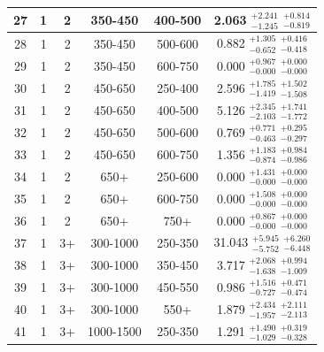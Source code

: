 \begin{table}[htbp]
\begin{centering}
\begin{tabular}{|c|c|c|c|c||c|}
\hline
27 &               1 &               2 &         350-450 &         400-500 & 2.063 $^{+2.241}_{-1.245}$ $^{+0.814}_{-0.819}$ \\ 
\hline
28 &               1 &               2 &         350-450 &         500-600 & 0.882 $^{+1.305}_{-0.652}$ $^{+0.416}_{-0.418}$ \\ 
\hline
29 &               1 &               2 &         350-450 &         600-750 & 0.000 $^{+0.967}_{-0.000}$ $^{+0.000}_{-0.000}$ \\ 
\hline
30 &               1 &               2 &         450-650 &         250-400 & 2.596 $^{+1.785}_{-1.419}$ $^{+1.502}_{-1.508}$ \\ 
\hline
31 &               1 &               2 &         450-650 &         400-500 & 5.126 $^{+2.345}_{-2.103}$ $^{+1.741}_{-1.772}$ \\ 
\hline
32 &               1 &               2 &         450-650 &         500-600 & 0.769 $^{+0.771}_{-0.463}$ $^{+0.295}_{-0.297}$ \\ 
\hline
33 &               1 &               2 &         450-650 &         600-750 & 1.356 $^{+1.183}_{-0.874}$ $^{+0.984}_{-0.986}$ \\ 
\hline
34 &               1 &               2 &            650+ &         250-600 & 0.000 $^{+1.431}_{-0.000}$ $^{+0.000}_{-0.000}$ \\ 
\hline
35 &               1 &               2 &            650+ &         600-750 & 0.000 $^{+1.508}_{-0.000}$ $^{+0.000}_{-0.000}$ \\ 
\hline
36 &               1 &               2 &            650+ &            750+ & 0.000 $^{+0.867}_{-0.000}$ $^{+0.000}_{-0.000}$ \\ 
\hline
37 &               1 &              3+ &        300-1000 &         250-350 & 31.043 $^{+5.945}_{-5.752}$ $^{+6.260}_{-6.448}$ \\ 
\hline
38 &               1 &              3+ &        300-1000 &         350-450 & 3.717 $^{+2.068}_{-1.638}$ $^{+0.994}_{-1.009}$ \\ 
\hline
39 &               1 &              3+ &        300-1000 &         450-550 & 0.986 $^{+1.516}_{-0.727}$ $^{+0.471}_{-0.474}$ \\ 
\hline
40 &               1 &              3+ &        300-1000 &            550+ & 1.879 $^{+2.434}_{-1.957}$ $^{+2.111}_{-2.113}$ \\ 
\hline
41 &               1 &              3+ &       1000-1500 &         250-350 & 1.291 $^{+1.490}_{-1.029}$ $^{+0.319}_{-0.328}$ \\ 

\end{tabular}
\end{centering}
\end{table}
